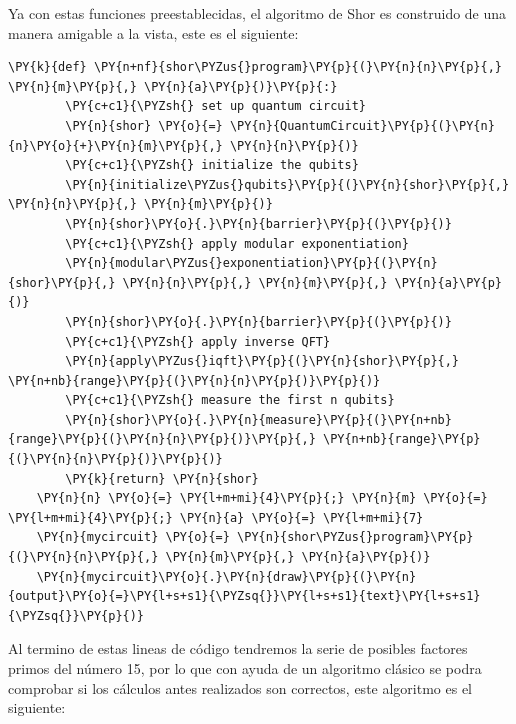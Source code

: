 Ya con estas funciones preestablecidas, el algoritmo de Shor es construido de una manera amigable a la vista, este es el siguiente:
\begin{tcolorbox}[breakable, size=fbox, boxrule=1pt, pad at break*=1mm,colback=cellbackground, colframe=cellborder]
    \begin{Verbatim}[commandchars=\\\{\}]
    \PY{k}{def} \PY{n+nf}{shor\PYZus{}program}\PY{p}{(}\PY{n}{n}\PY{p}{,} \PY{n}{m}\PY{p}{,} \PY{n}{a}\PY{p}{)}\PY{p}{:}
        \PY{c+c1}{\PYZsh{} set up quantum circuit}
        \PY{n}{shor} \PY{o}{=} \PY{n}{QuantumCircuit}\PY{p}{(}\PY{n}{n}\PY{o}{+}\PY{n}{m}\PY{p}{,} \PY{n}{n}\PY{p}{)}
        \PY{c+c1}{\PYZsh{} initialize the qubits}
        \PY{n}{initialize\PYZus{}qubits}\PY{p}{(}\PY{n}{shor}\PY{p}{,} \PY{n}{n}\PY{p}{,} \PY{n}{m}\PY{p}{)}
        \PY{n}{shor}\PY{o}{.}\PY{n}{barrier}\PY{p}{(}\PY{p}{)}
        \PY{c+c1}{\PYZsh{} apply modular exponentiation}
        \PY{n}{modular\PYZus{}exponentiation}\PY{p}{(}\PY{n}{shor}\PY{p}{,} \PY{n}{n}\PY{p}{,} \PY{n}{m}\PY{p}{,} \PY{n}{a}\PY{p}{)}
        \PY{n}{shor}\PY{o}{.}\PY{n}{barrier}\PY{p}{(}\PY{p}{)}
        \PY{c+c1}{\PYZsh{} apply inverse QFT}
        \PY{n}{apply\PYZus{}iqft}\PY{p}{(}\PY{n}{shor}\PY{p}{,} \PY{n+nb}{range}\PY{p}{(}\PY{n}{n}\PY{p}{)}\PY{p}{)}
        \PY{c+c1}{\PYZsh{} measure the first n qubits}
        \PY{n}{shor}\PY{o}{.}\PY{n}{measure}\PY{p}{(}\PY{n+nb}{range}\PY{p}{(}\PY{n}{n}\PY{p}{)}\PY{p}{,} \PY{n+nb}{range}\PY{p}{(}\PY{n}{n}\PY{p}{)}\PY{p}{)}
        \PY{k}{return} \PY{n}{shor}
    \PY{n}{n} \PY{o}{=} \PY{l+m+mi}{4}\PY{p}{;} \PY{n}{m} \PY{o}{=} \PY{l+m+mi}{4}\PY{p}{;} \PY{n}{a} \PY{o}{=} \PY{l+m+mi}{7}
    \PY{n}{mycircuit} \PY{o}{=} \PY{n}{shor\PYZus{}program}\PY{p}{(}\PY{n}{n}\PY{p}{,} \PY{n}{m}\PY{p}{,} \PY{n}{a}\PY{p}{)}
    \PY{n}{mycircuit}\PY{o}{.}\PY{n}{draw}\PY{p}{(}\PY{n}{output}\PY{o}{=}\PY{l+s+s1}{\PYZsq{}}\PY{l+s+s1}{text}\PY{l+s+s1}{\PYZsq{}}\PY{p}{)}
    \end{Verbatim}
    \end{tcolorbox}
Al termino de estas lineas de código tendremos la serie de posibles factores primos del número 15, por lo que con ayuda de un algoritmo clásico se podra comprobar si los cálculos 
antes realizados son correctos, este algoritmo es el siguiente:
